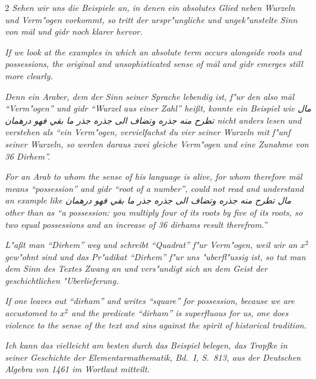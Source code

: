 \documentclass[10pt,a4paper]{article}
\newcommand{\RL}[1]{\beginR#1\endR}
\newcommand{\ar}[1]{{\arabicfont\RL{#1}}}
\newcommand{\enquote}[1]{``#1''}
\begin{document}
\begin{paracol}{2}
\textit{Sehen wir uns die Beispiele an, in denen ein absolutes Glied neben Wurzeln und Verm"ogen vorkommt, so tritt der urspr"ungliche und ungek"unstelte Sinn von \textit{m\=al} und \textit{gidr} noch klarer hervor.}

\switchcolumn

\textit{If we look at the examples in which an absolute term occurs alongside roots and possessions, the original and unsophisticated sense of \textit{m\=al} and \textit{gidr} emerges still more clearly.}

\switchcolumn*

\textit{Denn ein Araber, dem der Sinn seiner Sprache lebendig ist, f"ur den also \textit{m\=al} \enquote{Verm"ogen} und \textit{gidr} \enquote{Wurzel aus einer Zahl} hei\ss{}t, konnte ein Beispiel wie \ar{مال تطرح منه جذره وتضاف الى جذره جذر ما بقي فهو درهمان} nicht anders lesen und verstehen als \enquote{ein Verm"ogen, vervielfachst du vier seiner Wurzeln mit f"unf seiner Wurzeln, so werden daraus zwei gleiche Verm"ogen und eine Zunahme von 36 Dirhem}.}

\switchcolumn

\textit{For an Arab to whom the sense of his language is alive, for whom therefore \textit{m\=al} means \enquote{possession} and \textit{gidr} \enquote{root of a number}, could not read and understand an example like \ar{مال تطرح منه جذره وتضاف الى جذره جذر ما بقي فهو درهمان} other than as \enquote{a possession: you multiply four of its roots by five of its roots, so two equal possessions and an increase of 36 dirhams result therefrom.}}

\switchcolumn*

\textit{L"a\ss{}t man \enquote{Dirhem} weg und schreibt \enquote{Quadrat} f"ur Verm"ogen, weil wir an $x^{2}$ gew"ohnt sind und das Pr"adikat \enquote{Dirhem} f"ur uns "uberfl"ussig ist, so tut man dem Sinn des Textes Zwang an und vers"undigt sich an dem Geist der geschichtlichen "Uberlieferung.}

\switchcolumn

\textit{If one leaves out \enquote{dirham} and writes \enquote{square} for possession, because we are accustomed to $x^{2}$ and the predicate \enquote{dirham} is superfluous for us, one does violence to the sense of the text and sins against the spirit of historical tradition.}

\switchcolumn*

\textit{Ich kann das vielleicht am besten durch das Beispiel belegen, das Tropfke in seiner \textit{Geschichte der Elementarmathematik}, Bd.\ I, S.\ 813, aus der \textit{Deutschen Algebra} von 1461 im Wortlaut mitteilt.}


\end{paracol}
\end{document}
